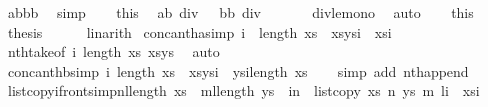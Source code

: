 \begin{isabellebody}
\ {\isachardoublequoteopen}a{\isacharplus}b{\isacharless}b{\isacharplus}b{\isachardoublequoteclose}\ \isamarkupfalse%
\ simp\isanewline
\ \ \isamarkupfalse%
\ this\ \isamarkupfalse%
\ {\isachardoublequoteopen}{\isacharparenleft}a{\isacharplus}b{\isacharparenright}\ div\ {}\ {\isacharless}\ {\isacharparenleft}b{\isacharplus}b{\isacharparenright}\ div\ {}{\isachardoublequoteclose}\isanewline
\ \ \ \ \isamarkupfalse%
\ div{\isacharunderscore}le{\isacharunderscore}mono\ \isamarkupfalse%
\ auto\isanewline
\ \ \isamarkupfalse%
\ this\ \isamarkupfalse%
\ {\isacharquery}thesis\isanewline
\ \ \ \ \isamarkupfalse%
\ linarith\isanewline
{}\isamarkupfalse%
%
\endisatagproof
{\isafoldproof}%
%
\isadelimproof
\isanewline
%
\endisadelimproof
\isanewline
{}\isamarkupfalse%
\ conca{\isacharunderscore}nth{\isacharunderscore}a{\isacharbrackleft}simp{\isacharbrackright}{\isacharcolon}{\isachardoublequoteopen}\ i\ {\isacharless}\ length\ xs\ {\isasymLongrightarrow}\ {\isacharparenleft}xs{\isacharat}ys{\isacharparenright}{\isacharbang}i\ {\isacharequal}\ xs{\isacharbang}i{\isachardoublequoteclose}\isanewline
%
\isadelimproof
\ \ %
\endisadelimproof
%
\isatagproof
{}\isamarkupfalse%
\ nth{\isacharunderscore}take{\isacharbrackleft}of\ i\ {\isachardoublequoteopen}length\ xs{\isachardoublequoteclose}\ {\isachardoublequoteopen}xs{\isacharat}ys{\isachardoublequoteclose}{\isacharbrackright}\ \isamarkupfalse%
\ auto%
\endisatagproof
{\isafoldproof}%
%
\isadelimproof
\isanewline
%
\endisadelimproof
{}\isamarkupfalse%
\ conca{\isacharunderscore}nth{\isacharunderscore}b{\isacharbrackleft}simp{\isacharbrackright}{\isacharcolon}{\isachardoublequoteopen}\ i{\isasymge}\ length\ xs\ {\isasymLongrightarrow}\ {\isacharparenleft}xs{\isacharat}ys{\isacharparenright}{\isacharbang}i\ {\isacharequal}\ ys{\isacharbang}{\isacharparenleft}i{\isacharminus}length\ xs{\isacharparenright}{\isachardoublequoteclose}\isanewline
%
\isadelimproof
\ \ %
\endisadelimproof
%
\isatagproof
{}\isamarkupfalse%
\ {\isacharparenleft}simp\ add{\isacharcolon}\ nth{\isacharunderscore}append{\isacharparenright}%
\endisatagproof
{\isafoldproof}%
%
\isadelimproof
\isanewline
%
\endisadelimproof
{}\isamarkupfalse%
\ list{\isacharunderscore}copy{\isacharunderscore}i{\isacharunderscore}front{\isacharbrackleft}simp{\isacharbrackright}{\isacharcolon}{\isachardoublequoteopen}{\isacharparenleft}n{\isacharplus}l{\isacharparenright}{\isasymle}length\ xs\ {\isasymLongrightarrow}\ {\isacharparenleft}m{\isacharplus}l{\isacharparenright}{\isasymle}length\ ys\ {\isasymLongrightarrow}\ i{\isacharless}n\ {\isasymLongrightarrow}\ {\isacharparenleft}list{\isacharunderscore}copy\ xs\ n\ ys\ m\ l{\isacharparenright}{\isacharbang}i\ {\isacharequal}\ xs{\isacharbang}i{\isachardoublequoteclose}\isanewline

\end{isabellebody}
